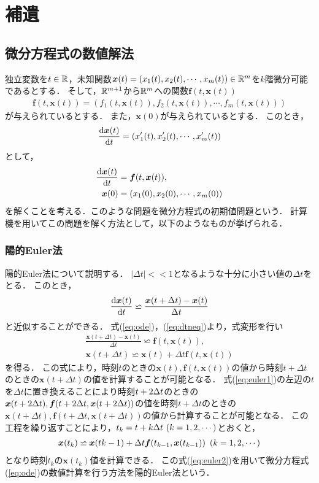 \chapter{補遺}
\label{chap:補遺}
\section{微分方程式の数値解法}
独立変数を$t \in \mathbb{R}$，未知関数$\bm{x}(t) = \left(x_1(t),x_2(t),\cdots,x_m(t)\right) \in \mathbb{R}^m$を$k$階微分可能であるとする．
そして，$\mathbb{R}^{m+1}$から$\mathbb{R}^m$への関数$\bm{f}(t,\bm{x}(t))$
\begin{align}
    \bm{f}(t,\bm{x}(t)) = \left(f_1(t,\bm{x}(t)),f_2(t,\bm{x}(t)),\cdots,f_m(t,\bm{x}(t))\right)
\end{align}
が与えられているとする．
また，$\bm{x}(0)$が与えられているとする．
このとき，
\begin{align}
    \frac{\mathrm{d}\bm{x}(t)}{\mathrm{d}t} = \left(x_1^{\prime}(t),x_2^{\prime}(t),\cdots,x_m^{\prime}(t)\right)
\end{align}
として，
\begin{align}
    \frac{\mathrm{d}\bm{x}(t)}{\mathrm{d}t} &= \bm{f}(t,\bm{x}(t)), \label{eq:ode} \\
    \bm{x}(0) &= \left(x_1(0),x_2(0),\cdots,x_m(0)\right)
\end{align}
を解くことを考える．このような問題を微分方程式の初期値問題という．
計算機を用いてこの問題を解く方法として，以下のようなものが挙げられる．
\subsection{陽的Euler法}
陽的Euler法について説明する．
$|\Delta t| << 1 $となるような十分に小さい値の$\Delta t$をとる．
このとき，
\begin{align}
    \label{eq:dtneq}
    \frac{\mathrm{d}\bm{x}(t)}{\mathrm{d}t} \backsimeq \frac{\bm{x}(t+\Delta t) - \bm{x}(t)}{\Delta t}
\end{align}
と近似することができる．
式(\ref{eq:ode})，(\ref{eq:dtneq})より，式変形を行い
\begin{align}
    \frac{\bm{x}(t + \Delta t) - \bm{x}(t)}{\Delta t} \backsimeq \bm{f}(t,\bm{x}(t)),\\
    \bm{x}(t + \Delta t) \backsimeq \bm{x}(t) + \Delta t \bm{f}(t,\bm{x}(t)) \label{eq:euler1}
\end{align}
を得る．
この式により，時刻$t$のときの$\bm{x}(t),\bm{f}(t,\bm{x}(t))$の値から時刻$t+\Delta t$のときの$\bm{x}(t+\Delta t)$の値を計算することが可能となる．
式(\ref{eq:euler1})の左辺の$t$を$\Delta t$に置き換えることにより時刻$t + 2\Delta t$のときの$\bm{x}(t+2\Delta t),\bm{f}(t+2\Delta t,\bm{x}(t+2\Delta t))$の値を時刻$t+\Delta t$のときの$\bm{x}(t+\Delta t),\bm{f}(t+\Delta t,\bm{x}(t+\Delta t))$の値から計算することが可能となる．
この工程を繰り返すことにより，$t_k = t + k\Delta t \ (k = 1,2,\cdots)$とおくと，
\begin{align}
    \bm{x}(t_k) \backsimeq \bm{x}(t{k-1}) + \Delta t\bm{f}(t_{k-1},\bm{x}(t_{k-1})) \ \left(k = 1,2,\cdots\right) \label{eq:euler2}
\end{align}
となり時刻$t_k$の$\bm{x}(t_k)$値を計算できる．
この式(\ref{eq:euler2})を用いて微分方程式(\ref{eq:ode})の数値計算を行う方法を陽的Euler法という．

